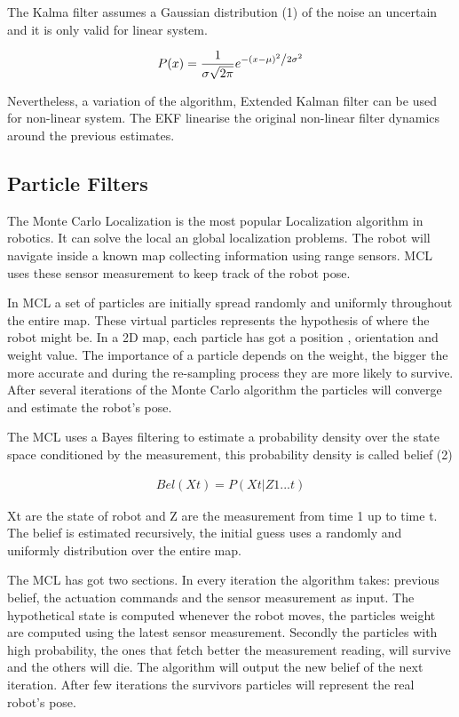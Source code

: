 \documentclass[10pt,journal,compsoc]{IEEEtran}
\begin{document}
The Kalma filter assumes a Gaussian distribution (1) of the noise an uncertain and it is only valid for linear system.

\begin{align}
P(x) = \frac{1}{{\sigma \sqrt {2\pi } }}e^{{{ - \left( {x - \mu } \right)^2 } \mathord{\left/ {\vphantom {{ - \left( {x - \mu } \right)^2 } {2\sigma ^2 }}} \right. \kern-\nulldelimiterspace} {2\sigma ^2 }}}
\end{align}

Nevertheless, a variation of the algorithm, Extended Kalman filter can be used for non-linear system. The EKF linearise the original non-linear filter dynamics around the previous estimates.

\subsection{Particle Filters}

The Monte Carlo Localization is the most popular Localization algorithm in robotics. It can solve the local an global localization problems. The robot will navigate inside a known map collecting information using range sensors. MCL uses these sensor measurement to keep track of the robot pose. 

In MCL a set of particles are initially spread randomly and uniformly throughout the entire map. These virtual particles represents the hypothesis of where the robot might be. In a 2D map, each particle has got a position , orientation and weight value. The importance of a particle depends on the weight, the bigger the more accurate and during the re-sampling process they are more likely to survive. After several iterations of the Monte Carlo algorithm the particles will converge and estimate the robot's pose.

The MCL uses a Bayes filtering to estimate a probability density over the state space conditioned by the measurement, this probability density is called belief (2)

\begin{align}
Bel(X{t}) = P(X{t} |Z{1}...{t} )
\end{align}

X{t} are the state of robot and Z are the measurement from time 1 up to time {t}. The belief is estimated recursively, the initial guess uses a randomly and uniformly distribution over the entire map. 



The MCL has got two sections. In every iteration the algorithm takes: previous belief, the actuation commands and the sensor measurement as input. The hypothetical state is computed whenever the robot moves, the particles weight are computed using the latest sensor measurement. Secondly the particles with high probability, the ones that fetch better the measurement reading, will survive and the others will die. The algorithm will output the new belief of the next iteration. After few iterations the survivors particles will represent the real robot's pose.
\end{document}
